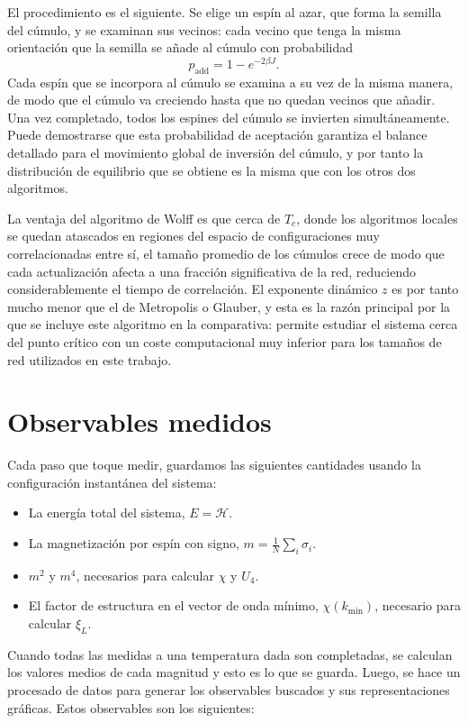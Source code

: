 El procedimiento es el siguiente. Se elige un espín al azar, que forma la semilla del cúmulo, y se examinan sus vecinos: cada vecino que tenga la misma orientación que la semilla se añade al cúmulo con probabilidad
\[
p_{\text{add}} = 1 - e^{-2\beta J}.
\]
Cada espín que se incorpora al cúmulo se examina a su vez de la misma manera, de modo que el cúmulo va creciendo hasta que no quedan vecinos que añadir. Una vez completado, todos los espines del cúmulo se invierten simultáneamente. Puede demostrarse que esta probabilidad de aceptación garantiza el balance detallado para el movimiento global de inversión del cúmulo, y por tanto la distribución de equilibrio que se obtiene es la misma que con los otros dos algoritmos.

La ventaja del algoritmo de Wolff es que cerca de $T_c$, donde los algoritmos locales se quedan atascados en regiones del espacio de configuraciones muy correlacionadas entre sí, el tamaño promedio de los cúmulos crece de modo que cada actualización afecta a una fracción significativa de la red, reduciendo considerablemente el tiempo de correlación. El exponente dinámico $z$ es por tanto mucho menor que el de Metropolis o Glauber, y esta es la razón principal por la que se incluye este algoritmo en la comparativa: permite estudiar el sistema cerca del punto crítico con un coste computacional muy inferior para los tamaños de red utilizados en este trabajo.

\section{Observables medidos}

Cada paso que toque medir, guardamos las siguientes cantidades usando la configuración instantánea del sistema:

\begin{itemize}
  \item La energía total del sistema, $E = \mathcal{H}$.
  \item La magnetización por espín con signo, $m = \frac{1}{N}\sum_i \sigma_i$.
  \item $m^2$ y $m^4$, necesarios para calcular $\chi$ y $U_4$.
  \item El factor de estructura en el vector de onda mínimo, $\chi(k_{\min})$, necesario para calcular $\xi_L$.
\end{itemize}

Cuando todas las medidas a una temperatura dada son completadas, se calculan los valores medios de cada magnitud y esto es lo que se guarda. Luego, se hace un procesado de datos para generar los observables buscados y sus representaciones gráficas. Estos observables son los siguientes:

